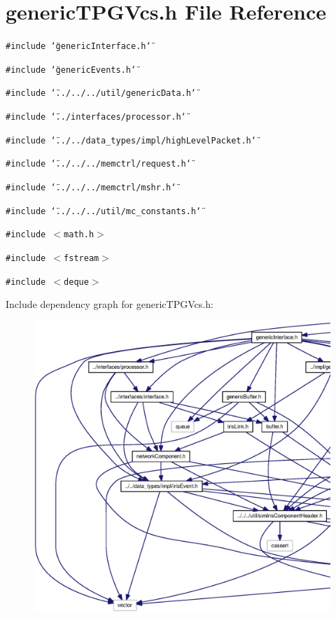 \section{genericTPGVcs.h File Reference}
\label{genericTPGVcs_8h}
{\tt \#include \char`\"{}genericInterface.h\char`\"{}}\par
{\tt \#include \char`\"{}genericEvents.h\char`\"{}}\par
{\tt \#include \char`\"{}../../../util/genericData.h\char`\"{}}\par
{\tt \#include \char`\"{}../interfaces/processor.h\char`\"{}}\par
{\tt \#include \char`\"{}../../data\_\-types/impl/highLevelPacket.h\char`\"{}}\par
{\tt \#include \char`\"{}../../../memctrl/request.h\char`\"{}}\par
{\tt \#include \char`\"{}../../../memctrl/mshr.h\char`\"{}}\par
{\tt \#include \char`\"{}../../../util/mc\_\-constants.h\char`\"{}}\par
{\tt \#include $<$math.h$>$}\par
{\tt \#include $<$fstream$>$}\par
{\tt \#include $<$deque$>$}\par


Include dependency graph for genericTPGVcs.h:\nopagebreak
\begin{figure}[H]
\begin{center}
\leavevmode
\includegraphics[width=420pt]{genericTPGVcs_8h__incl}
\end{center}
\end{figure}


